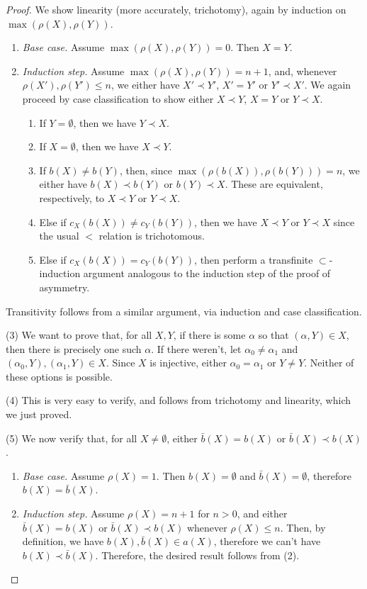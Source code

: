 \documentclass{article}
\theoremstyle{definition}
\theoremstyle{plain}
\theoremstyle{plain}
\theoremstyle{plain}
\theoremstyle{plain}
\theoremstyle{remark}
\theoremstyle{remark}
\theoremstyle{remark}
\theoremstyle{plain}
\theoremstyle{plain}
\begin{document}
\begin{proof}
We show linearity (more accurately, trichotomy), again by induction on $\max(\rho(X), \rho(Y))$.

\begin{enumerate}
    \item \textit{Base case.} Assume $\max(\rho(X), \rho(Y)) = 0$. Then $X = Y$.
    \item \textit{Induction step.} Assume $\max(\rho(X), \rho(Y)) = n+1$, and, whenever $\rho(X'), \rho(Y') \leq n$, we either have $X' \prec Y'$, $X' = Y'$ or $Y' \prec X'$. We again proceed by case classification to show either $X \prec Y$, $X = Y$ or $Y \prec X$.
    \begin{enumerate}
        \item If $Y = \emptyset$, then we have $Y \prec X$.
        \item If $X = \emptyset$, then we have $X \prec Y$.
        \item If $b(X) \neq b(Y)$, then, since $\max(\rho(b(X)), \rho(b(Y))) = n$, we either have $b(X) \prec b(Y)$ or $b(Y) \prec X$. These are equivalent, respectively, to $X \prec Y$ or $Y \prec X$.
        \item Else if $c_X(b(X)) \neq c_Y(b(Y))$, then we have $X \prec Y$ or $Y \prec X$ since the usual $<$ relation is trichotomous.
        \item Else if $c_X(b(X)) = c_Y(b(Y))$, then perform a transfinite $\subset$-induction argument analogous to the induction step of the proof of asymmetry.
    \end{enumerate}
\end{enumerate}

Transitivity follows from a similar argument, via induction and case classification.

(3) We want to prove that, for all $X, Y$, if there is some $\alpha$ so that $(\alpha, Y) \in X$, then there is precisely one such $\alpha$. If there weren't, let $\alpha_0 \neq \alpha_1$ and $(\alpha_0, Y), (\alpha_1, Y) \in X$. Since $X$ is injective, either $\alpha_0 = \alpha_1$ or $Y \neq Y$. Neither of these options is possible.

(4) This is very easy to verify, and follows from trichotomy and linearity, which we just proved.

(5) We now verify that, for all $X \neq \emptyset$, either $\bar{b}(X) = b(X)$ or $\bar{b}(X) \prec b(X)$.

\begin{enumerate}
    \item \textit{Base case.} Assume $\rho(X) = 1$. Then $b(X) = \emptyset$ and $\bar{b}(X) = \emptyset$, therefore $b(X) = \bar{b}(X)$.
    \item \textit{Induction step.} Assume $\rho(X) = n+1$ for $n > 0$, and either $\bar{b}(X) = b(X)$ or $\bar{b}(X) \prec b(X)$ whenever $\rho(X) \leq n$. Then, by definition, we have $b(X), \bar{b}(X) \in a(X)$, therefore we can't have $b(X) \prec \bar{b}(X)$. Therefore, the desired result follows from (2). \qedhere
\end{enumerate}
\end{proof}
\end{document}
